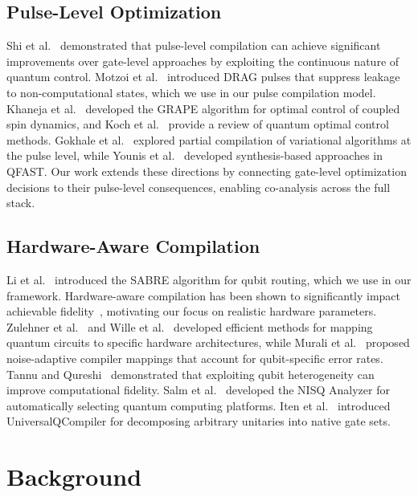 \documentclass[sigconf,nonacm]{acmart}
\begin{document}
\subsection{Pulse-Level Optimization}

Shi et al.~\cite{shi2019optimized} demonstrated that pulse-level compilation can achieve significant improvements over gate-level approaches by exploiting the continuous nature of quantum control. Motzoi et al.~\cite{motzoi2009simple} introduced DRAG pulses that suppress leakage to non-computational states, which we use in our pulse compilation model. Khaneja et al.~\cite{khaneja2005optimal} developed the GRAPE algorithm for optimal control of coupled spin dynamics, and Koch et al.~\cite{koch2022quantum} provide a review of quantum optimal control methods. Gokhale et al.~\cite{gokhale2020partial} explored partial compilation of variational algorithms at the pulse level, while Younis et al.~\cite{younis2021qfast} developed synthesis-based approaches in QFAST. Our work extends these directions by connecting gate-level optimization decisions to their pulse-level consequences, enabling co-analysis across the full stack.

\subsection{Hardware-Aware Compilation}

Li et al.~\cite{li2019tackling} introduced the SABRE algorithm for qubit routing, which we use in our framework. Hardware-aware compilation has been shown to significantly impact achievable fidelity~\cite{cowtan2019qubit}, motivating our focus on realistic hardware parameters. Zulehner et al.~\cite{zulehner2018efficient} and Wille et al.~\cite{wille2019mapping} developed efficient methods for mapping quantum circuits to specific hardware architectures, while Murali et al.~\cite{murali2019noise} proposed noise-adaptive compiler mappings that account for qubit-specific error rates. Tannu and Qureshi~\cite{tannu2019not} demonstrated that exploiting qubit heterogeneity can improve computational fidelity. Salm et al.~\cite{salm2021nisq} developed the NISQ Analyzer for automatically selecting quantum computing platforms. Iten et al.~\cite{iten2022introduction} introduced UniversalQCompiler for decomposing arbitrary unitaries into native gate sets.

\section{Background}
\label{sec:background}
\end{document}
